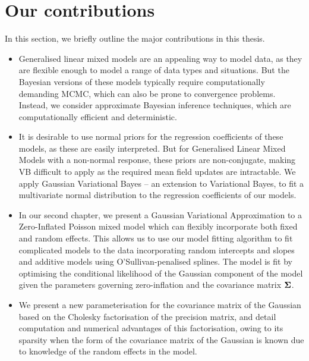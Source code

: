 \section{Our contributions}

In this section, we briefly outline the major contributions in this thesis.

\begin{itemize}

\item Generalised linear mixed models are an appealing way to model data, as
they are flexible enough to model a range of data types and situations. But the
Bayesian versions of these models typically require computationally demanding
MCMC, which can also be prone to convergence problems. Instead, we consider
approximate Bayesian inference techniques, which are computationally efficient
and deterministic.

\item It is desirable to use normal priors for the regression coefficients of
these models, as these are easily interpreted. But for Generalised Linear Mixed
Models with a non-normal response, these priors are non-conjugate, making VB
difficult to apply as the required mean field updates are intractable. We apply
Gaussian Variational Bayes -- an extension to Variational Bayes, to fit a
multivariate normal distribution to the regression coefficients of our models.

\item In our second chapter, we present a Gaussian Variational Approximation to
a Zero-Inflated Poisson mixed model which can flexibly incorporate both fixed
and random effects. This allows us to use our model fitting algorithm to fit
complicated models to the data incorporating random intercepts and slopes and
additive models using O'Sullivan-penalised splines.  The model is fit by
optimising the conditional likelihood of the Gaussian component of the model
given the parameters governing zero-inflation and the covariance matrix
${\boldsymbol \Sigma}$.

\item We present a new parameterisation for the covariance matrix of the
Gaussian based on the Cholesky factorisation of the precision matrix, and detail
computation and numerical advantages of this factorisation, owing to its
sparsity when the form of the covariance matrix of the Gaussian is known due to
knowledge of the random effects in the model.


\end{itemize}
